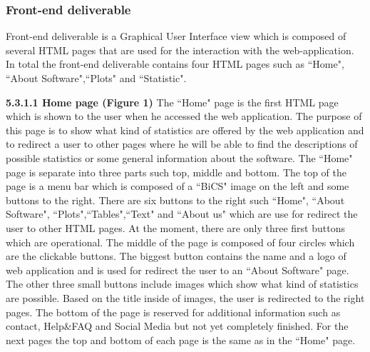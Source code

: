 \documentclass[conference,compsoc]{IEEEtran}
\begin{document}
\subsubsection{Front-end deliverable}
Front-end deliverable is a Graphical User Interface view which is composed of several HTML pages that are used for the interaction with the web-application. In total the front-end deliverable contains four HTML pages such as ``Home", ``About Software",``Plots" and ``Statistic". 

\noindent
\newline\newline
\textbf{5.3.1.1 Home page (Figure 1)}
\newline\newline
The ``Home" page is the first HTML page which is shown to the user when he accessed the web application. The purpose of this page is to show what kind of statistics are offered by the web application and to redirect a user to other pages where he will be able to find the descriptions of possible statistics or some general information about the software.                                                                                   
\newline
The ``Home" page is separate into three parts such top, middle and bottom. The top of the page is a menu bar which is composed of a ``BiCS" image on the left and some buttons to the right. There are six buttons to the right such ``Home", ``About Software", ``Plots",``Tables",``Text" and ``About us" which are use for redirect the user to other HTML pages. At the moment, there are only three first buttons which are operational.                                                                                                                                            
\newline
The middle of the page is composed of four circles which are the clickable buttons. The biggest button contains the name and a logo of web application and is used for redirect the user to an ``About Software" page. The other three small buttons include images which show what kind of statistics are possible. Based on the title inside of images, the user is redirected to the right pages.                                                                   
\newline
The bottom of the page is reserved for additional information such as contact, Help\&FAQ and Social Media but not yet completely finished.  
\newline      
For the next pages the top and bottom of each page is the same as in the ``Home" page.                                                   
     
\end{document}
